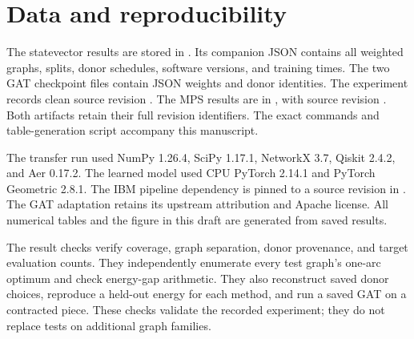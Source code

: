 \documentclass[review,onefignum,onetabnum]{siamart171218}
\begin{document}
\section{Data and reproducibility}\label{sec:reproducibility}
The statevector results are stored in .
Its companion JSON contains all weighted graphs, splits, donor schedules, software versions, and training times.
The two GAT checkpoint files contain JSON weights and donor identities.
The experiment records clean source revision .
The MPS results are in , with source revision .
Both artifacts retain their full revision identifiers.
The exact commands and table-generation script accompany this manuscript.

The transfer run used NumPy 1.26.4, SciPy 1.17.1, NetworkX 3.7, Qiskit 2.4.2, and Aer 0.17.2.
The learned model used CPU PyTorch 2.14.1 and PyTorch Geometric 2.8.1.
The IBM pipeline dependency is pinned to a source revision in .
The GAT adaptation retains its upstream attribution and Apache license.
All numerical tables and the figure in this draft are generated from saved results.

The result checks verify coverage, graph separation, donor provenance, and target evaluation counts.
They independently enumerate every test graph's one-arc optimum and check energy-gap arithmetic.
They also reconstruct saved donor choices, reproduce a held-out energy for each method, and run a saved GAT on a contracted piece.
These checks validate the recorded experiment; they do not replace tests on additional graph families.


\end{document}
